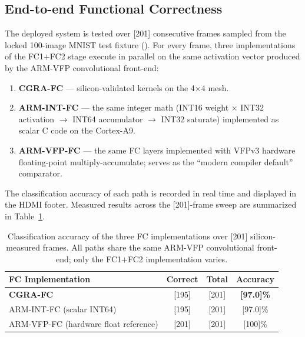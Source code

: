 \subsection{End-to-end Functional Correctness}
\label{ssec:func}

The deployed system is tested over [201] consecutive frames sampled
from the locked 100-image MNIST test fixture
(). For every frame, three
implementations of the FC1$+$FC2 stage execute in parallel on the
same activation vector  produced by the ARM-VFP
convolutional front-end:

\begin{enumerate}[leftmargin=1.4cm,itemsep=2pt,topsep=2pt]
\item \textbf{CGRA-FC} --- silicon-validated
 kernels on the 4$\times$4 mesh.
\item \textbf{ARM-INT-FC} --- the same integer math
(INT16 weight $\times$ INT32 activation $\to$ INT64 accumulator
$\to$ INT32 saturate) implemented as scalar C code on the
Cortex-A9.
\item \textbf{ARM-VFP-FC} --- the same FC layers implemented with
VFPv3 hardware floating-point multiply-accumulate; serves as the
``modern compiler default'' comparator.
\end{enumerate}

The classification accuracy of each path is recorded in real time
and displayed in the HDMI footer. Measured results across the
[201]-frame sweep are summarized in Table~\ref{tab:accuracy}.

\begin{table}[!htbp]
\centering
\caption{Classification accuracy of the three FC implementations
over [201] silicon-measured frames. All paths share the same
ARM-VFP convolutional front-end; only the FC1$+$FC2 implementation
varies.}
\label{tab:accuracy}
\small
\setlength{\tabcolsep}{8pt}
\begin{tabular}{@{}l c c c@{}}
\toprule
\textbf{FC Implementation} & \textbf{Correct} & \textbf{Total} & \textbf{Accuracy} \\
\midrule
\textbf{CGRA-FC}                       & [195] & [201] & \textbf{[97.0]\%} \\
ARM-INT-FC (scalar INT64)              & [195] & [201] & [97.0]\% \\
ARM-VFP-FC (hardware float reference)  & [201] & [201] & [100]\% \\
\bottomrule
\end{tabular}
\end{table}

